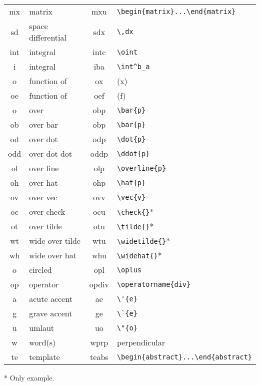\documentclass[11pt]{article}
\begin{document}
\begin{center}
\begin{tabular}{>{\ttfamily}cl>{\ttfamily}c>{\ttfamily}l}
  mx& matrix            & mxu{}   & \verb'\begin{matrix}...\end{matrix}' \\
  sd& space differential& sdx{}   & \verb.\,dx. \\
  int& integral         & intc{}  & \verb.\oint. \\
  i & integral          & iba{}   & \verb.\int^b_a. \\
  o & function of       & ox{}    & (x) \\
  oe& function of       & oef{}   & (f) \\
  o & over              & obp{}   & \verb.\bar{p}. \\
  ob& over bar          & obp{}   & \verb.\bar{p}. \\
  od& over dot          & odp{}   & \verb.\dot{p}. \\
  odd& over dot dot     & oddp{}  & \verb.\ddot{p}. \\
  ol& over line         & olp{}   & \verb.\overline{p}. \\
  oh& over hat          & ohp{}   & \verb.\hat{p}. \\
  ov& over vec          & ovv{}   & \verb.\vec{v}. \\
  oc& over check        & ocu{}   & \verb.\check{}.* \\
  ot& over tilde{}      & otu{}   & \verb.\tilde{}.* \\
  wt& wide over tilde{} & wtu{}   & \verb.\widetilde{}.* \\
  wh& wide over hat     & whu{}   & \verb.\widehat{}.* \\
  o & circled{}         & opl{}   & \verb.\oplus. \\
  op& operator          & opdiv{} & \verb.\operatorname{div}. \\
  a & acute accent      & ae{}    & \verb.\'{e}. \\
  g & grave accent      & ge{}    & \verb.\`{e}. \\
  u & umlaut            & uo{}    & \verb.\"{o}. \\
  w & word(s)           & wprp{}  & perpendicular \\
  te& template          & teabs{} & \verb"\begin{abstract}...\end{abstract}" \\
\bottomrule
\end{tabular}
\end{center}
* Only example.




\end{document}
